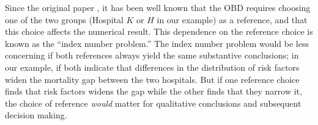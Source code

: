 

Since the original paper \citep{oaxaca1973}, it has been well known that the OBD requires choosing one of the two groups (Hospital $K$ or $H$ in our example) as a reference, and that this choice affects the numerical result.
This dependence on the reference choice is known as the ``index number problem.''
The index number problem would be less concerning if both references always yield the same substantive conclusions;
in our example, if both indicate that differences in the distribution of risk factors widen the mortality gap between the two hospitals.
But if one reference choice finds that risk factors widens the gap while the other finds that they narrow it, the choice of reference \emph{would} matter for qualitative conclusions and subsequent decision making.

